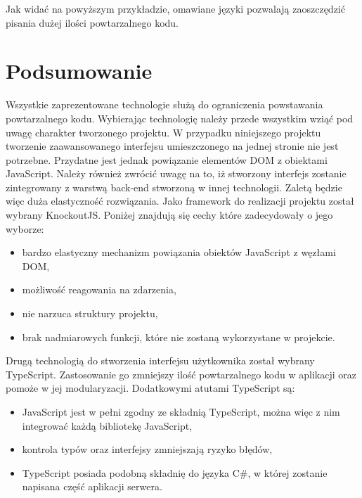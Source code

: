 Jak widać na powyższym przykładzie, omawiane języki pozwalają zaoszczędzić pisania dużej ilości powtarzalnego kodu.


\section{Podsumowanie}
Wszystkie zaprezentowane technologie służą do ograniczenia powstawania powtarzalnego kodu. Wybierając technologię należy przede wszystkim wziąć pod uwagę charakter tworzonego projektu. W przypadku niniejszego projektu tworzenie zaawansowanego interfejsu umieszczonego na jednej stronie nie jest potrzebne. Przydatne jest jednak powiązanie elementów DOM z obiektami JavaScript. Należy również zwrócić uwagę na to, iż stworzony interfejs zostanie zintegrowany z warstwą back-end stworzoną w innej technologii. Zaletą będzie więc duża elastyczność rozwiązania. Jako framework do realizacji projektu został wybrany KnockoutJS. Poniżej znajdują się cechy które zadecydowały o jego wyborze:
\begin{itemize}
\item bardzo elastyczny mechanizm powiązania obiektów JavaScript z węzłami DOM,
\item możliwość reagowania na zdarzenia,
\item nie narzuca struktury projektu,
\item brak nadmiarowych funkcji, które nie zostaną wykorzystane w projekcie.
\end{itemize}

Drugą technologią do stworzenia interfejsu użytkownika został wybrany TypeScript. Zastosowanie go zmniejszy ilość powtarzalnego kodu w aplikacji oraz pomoże w jej modularyzacji. Dodatkowymi atutami TypeScript są:
\begin{itemize}
\item JavaScript jest w pełni zgodny ze składnią TypeScript, można więc z nim integrować każdą bibliotekę JavaScript,
\item kontrola typów oraz interfejsy zmniejszają ryzyko błędów,
\item TypeScript posiada podobną składnię do języka C\#, w której zostanie napisana część aplikacji serwera.
\end{itemize}

